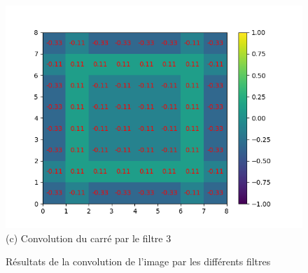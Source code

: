 \begin{figure}[!h]
        \includegraphics[width=\textwidth]{img/cnn_exemple/square/convolution_filtre_3.png}
        \center 
        (c) Convolution du carré par le filtre 3
    \endminipage
    \caption{Résultats de la convolution de l'image par les différents filtres}
\end{figure}

\newpage

